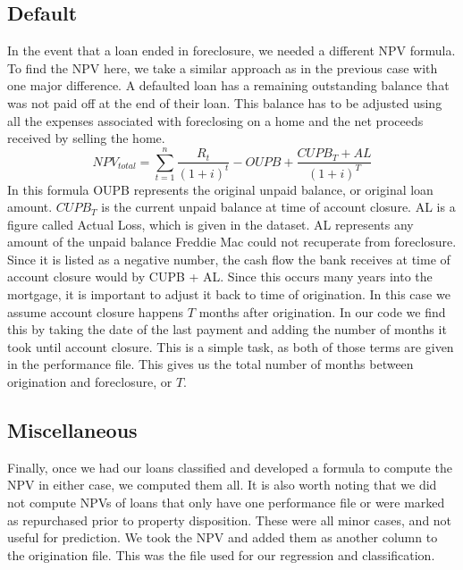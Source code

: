 \documentclass[12 pt]{uncw_thesis}
\theoremstyle{plain}
\theoremstyle{remark}
\theoremstyle{definition}
\begin{document}
\subsection{Default}
In the event that a loan ended in foreclosure, we needed a different NPV formula. To find the NPV here, we take a similar approach as in the previous case with one major difference. A defaulted loan has a remaining outstanding balance that was not paid off at the end of their loan. This balance has to be adjusted using all the expenses associated with foreclosing on a home and the net proceeds received by selling the home. 
\[NPV_{total} = \sum_{t=1}^n \frac{R_t}{(1+i)^t} - OUPB + \frac{CUPB_T + AL}{(1+i)^T}\]
In this formula OUPB represents the original unpaid balance, or original loan amount. $CUPB_T$ is the current unpaid balance at time of account closure. AL is a figure called Actual Loss,  which is given in the dataset. AL represents any amount of the unpaid balance Freddie Mac could not recuperate from foreclosure. Since it is listed as a negative number, the cash flow the bank receives at time of account closure would by CUPB + AL. Since this occurs many years into the mortgage, it is important to adjust it back to time of origination. In this case we assume account closure happens \(T\) months after origination. In our code we find this by taking the date of the last payment and adding the number of months it took until account closure. This is a simple task, as both of those terms are given in the performance file. This gives us the total number of months between origination and foreclosure, or \(T\). 
\subsection{Miscellaneous}
Finally, once we had our loans classified and developed a formula to compute the NPV in either case, we computed them all. It is also worth noting that we did not compute NPVs of loans that only have one performance file or were marked as repurchased prior to property disposition. These were all minor cases, and not useful for prediction. We took the NPV and added them as another column to the origination file. This was the file used for our regression and classification. 
\end{document}
